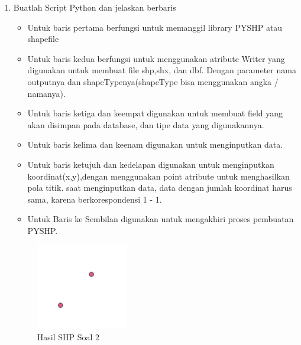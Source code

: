 \begin{enumerate}
	\item Buatlah Script Python dan jelaskan berbaris
	
	\begin{itemize}
		\item Untuk baris pertama berfungsi untuk memanggil library PYSHP atau shapefile
		\item Untuk baris kedua berfungsi untuk menggunakan atribute Writer yang digunakan untuk membuat file shp,shx, dan dbf. \hfill\break Dengan parameter nama outputnya dan shapeTypenya(shapeType bisa menggunakan angka / namanya).
		\item Untuk baris ketiga dan keempat digunakan untuk membuat field yang akan disimpan pada database, dan tipe data yang digunakannya.
		\item Untuk baris kelima dan keenam digunakan untuk menginputkan data.
		\item Untuk baris ketujuh dan kedelapan digunakan untuk menginputkan koordinat(x,y),dengan menggunakan point atribute untuk menghasilkan pola titik. \hfill\break
		saat menginputkan data, data dengan jumlah koordinat harus sama, karena berkorespondensi 1 - 1.
		\item Untuk Baris ke Sembilan digunakan untuk mengakhiri proses pembuatan PYSHP.
	\end{itemize}
	\hfill\break
	\begin{figure}[H]
		\includegraphics[width=4cm]{figures/1174004/2/2.png}
		\centering
		\caption{Hasil SHP Soal 2}
	\end{figure}


\end{enumerate}
